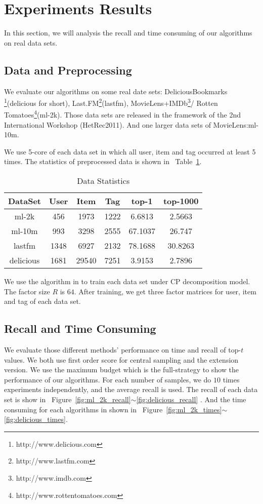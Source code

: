\documentclass[letterpaper]{article}
\newcommand{\Figs}[2]  {Figure~\ref{fig:#1}$\sim$\ref{fig:#2}}
\newcommand{\Table}[1] {Table~\ref{table:#1}}
\begin{document}
\section{Experiments Results}
In this section, we will analysis the recall
and time consuming of our algorithms on real data sets.

\subsection{Data and Preprocessing}
We evaluate our algorithms on some real date sets:
DeliciousBookmarks
\footnote{http://www.delicious.com}(delicious for short),
Last.FM\footnote{http://www.lastfm.com}(lastfm),
MovieLens+IMDb\footnote{http://www.imdb.com }/
Rotten Tomatoes\footnote{http://www.rottentomatoes.com}(ml-2k).
Those data sets are released in the framework of the 2nd International Workshop (HetRec2011).
And one larger data sets of MovieLens\cite{Harper2015}:ml-10m.

We use 5-core of each data set in which all user, item and tag occurred at least 5 times.
The statistics of preprocessed data is shown in ~\Table{Data}.
\begin{table}[ht]
  \centering
  \begin{tabular}{|c|c|c|c|c|c|}
    \hline
    DataSet     & User & Item    & Tag    & top-1   & top-1000\\
    \hline
    ml-2k       & 456  &  1973   &  1222  & 6.6813  & 2.5663 \\
    ml-10m      & 993  &  3298   &  2555  & 67.1037 & 26.747 \\
    lastfm      & 1348 &  6927   &  2132  & 78.1688 & 30.8263\\
    delicious   & 1681 &  29540  &  7251  & 3.9153  & 2.7896 \\
    \hline
  \end{tabular}
  \caption{Data Statistics}
  \label{table:Data}
\end{table}
We use the algorithm in \cite{Rendle_RTF} to train each data set under CP decomposition model.
The factor size $R$ is $64$.
After training, we get three factor matrices for user, item and tag of each data set.

\subsection{Recall and Time Consuming}
We evaluate those different methods' performance on time and recall of top-$t$ values.
We both use first order score for central sampling and the extension version.
We use the maximum budget which is the full-strategy to show the performance of our algorithms.
For each number of samples, we do $10$ times experiments independently, and the average recall is used.
The recall of each data set is show in ~\Figs{ml_2k_recall}{delicious_recall} .
And the time consuming for each algorithms in shown in ~\Figs{ml_2k_times}{delicious_times}.
\end{document}
